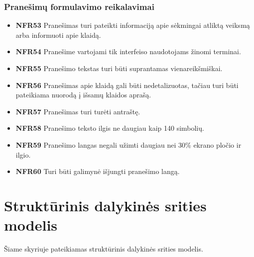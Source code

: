 \documentclass{VUMIFPSbakalaurinis}
\begin{document}
\subsubsection{Pranešimų formulavimo reikalavimai}
\begin{itemize}
	\item \textbf{NFR53} Pranešimas turi pateikti informaciją apie sėkmingai atliktą veiksmą arba informuoti apie klaidą.
	\item \textbf{NFR54} Pranešime vartojami tik interfeiso naudotojams žinomi terminai.
	\item \textbf{NFR55} Pranešimo tekstas turi būti suprantamas vienareikšmiškai.
	\item \textbf{NFR56} Pranešimas apie klaidą gali būti nedetalizuotas, tačiau turi būti pateikiama nuorodą į išsamų klaidos aprašą.
	\item \textbf{NFR57} Pranešimas turi turėti antraštę.
	\item \textbf{NFR58} Pranešimo teksto ilgis ne daugiau kaip 140 simbolių.
	\item \textbf{NFR59} Pranešimo langas negali užimti daugiau nei 30\% ekrano pločio ir ilgio.
	\item \textbf{NFR60} Turi būti galimynė išjungti pranešimo langą.
\end{itemize}

\section{Struktūrinis dalykinės srities modelis}
Šiame skyriuje pateikiamas struktūrinis dalykinės srities modelis.
\end{document}

